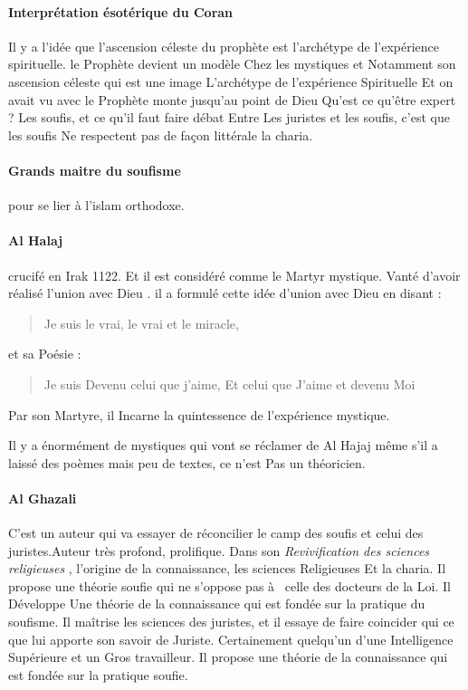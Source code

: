 \paragraph{Interprétation ésotérique du Coran}
Il y a l'idée 
que l'ascension céleste du prophète est 
l'archétype de l'expérience spirituelle. 
 le Prophète devient un modèle 
Chez les mystiques et 
Notamment son ascension céleste qui  est une image 
L'archétype de l'expérience 
Spirituelle  Et on avait vu avec le Prophète monte jusqu'au point de Dieu  Qu'est ce qu'être expert ?
Les soufis, et  ce qu'il faut faire débat 
Entre 
Les juristes et les soufis, c'est que les soufis 
Ne respectent pas 
de façon littérale la charia.

\paragraph{Grands maitre du soufisme}pour se lier à l'islam orthodoxe.
\paragraph{Al Halaj} crucifé en Irak 1122. Et il est considéré comme 
le 
Martyr mystique.
Vanté d'avoir réalisé l'union avec Dieu   . il a formulé cette idée d'union avec Dieu en disant :
\begin{quote}
    Je suis le vrai, le vrai et le miracle, 
\end{quote}
et sa Poésie : 
 \begin{quote}
    Je suis 
Devenu celui que j'aime, 
Et celui que 
J'aime et devenu  Moi 
\end{quote}
 Par son 
Martyre, il 
Incarne la quintessence de 
l'expérience mystique.  
  
Il y a 
énormément 
de mystiques qui vont se réclamer de Al Hajaj même s'il a laissé des poèmes mais peu 
de textes, ce n'est 
Pas un théoricien.
\paragraph{Al Ghazali} 
C'est un auteur 
qui  va essayer de réconcilier le camp des soufis et celui des juristes.Auteur très profond, prolifique. Dans son \textit{Revivification des sciences religieuses 
},  l'origine de la connaissance, les sciences 
Religieuses 
Et la charia.  Il propose une théorie soufie qui  ne s'oppose pas à  celle des docteurs de la Loi. Il 
Développe 
Une théorie de la connaissance qui  est fondée sur la 
pratique du soufisme. 
Il maîtrise les sciences des juristes, et il essaye 
de faire coincider qui  ce que lui apporte son savoir de 
Juriste. Certainement quelqu'un d'une 
Intelligence 
Supérieure et un 
Gros travailleur. Il propose une théorie 
de la connaissance 
qui  est fondée sur la pratique soufie.

